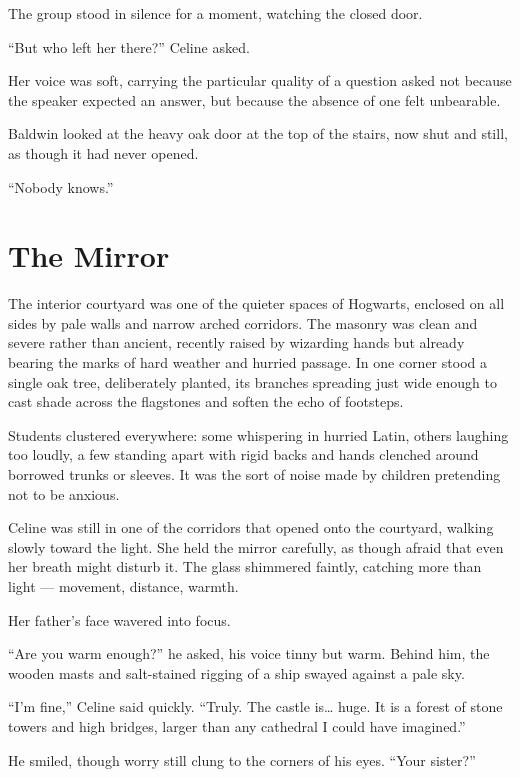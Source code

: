 The group stood in silence for a moment, watching the closed door.

\enquote{But who left her there?} Celine asked.

Her voice was soft, carrying the particular quality of a question asked not because the speaker expected an answer, but because the absence of one felt unbearable.

Baldwin looked at the heavy oak door at the top of the stairs, now shut and still, as though it had never opened.

\enquote{Nobody knows.}








\section*{The Mirror}
 
The interior courtyard was one of the quieter spaces of Hogwarts, enclosed on all sides by pale walls and narrow arched corridors. The masonry was clean and severe rather than ancient, recently raised by wizarding hands but already bearing the marks of hard weather and hurried passage. In one corner stood a single oak tree, deliberately planted, its branches spreading just wide enough to cast shade across the flagstones and soften the echo of footsteps.
 
Students clustered everywhere: some whispering in hurried Latin, others laughing too loudly, a few standing apart with rigid backs and hands clenched around borrowed trunks or sleeves. It was the sort of noise made by children pretending not to be anxious.
 
Celine was still in one of the corridors that opened onto the courtyard, walking slowly toward the light. She held the mirror carefully, as though afraid that even her breath might disturb it. The glass shimmered faintly, catching more than light --- movement, distance, warmth.
 
Her father's face wavered into focus.
 
\enquote{Are you warm enough?} he asked, his voice tinny but warm. Behind him, the wooden masts and salt-stained rigging of a ship swayed against a pale sky.
 
\enquote{I'm fine,} Celine said quickly. \enquote{Truly. The castle is\ldots{} huge. It is a forest of stone towers and high bridges, larger than any cathedral I could have imagined.}
 
He smiled, though worry still clung to the corners of his eyes. \enquote{Your sister?}
 
